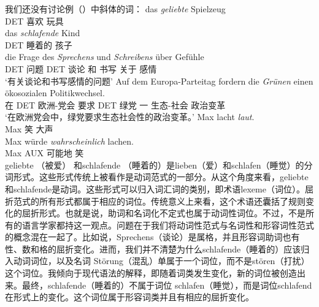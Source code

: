 我们还没有讨论例（）中斜体的词：
\eal
\ex 
\gll das \emph{geliebte} Spielzeug\\
	 DET 喜欢 玩具\\
\ex 
\gll das \emph{schlafende} Kind\\
	 DET 睡着的 孩子\\
\ex 
\gll die Frage des \emph{Sprechens} und \emph{Schreibens} über Gefühle\\
	 DET 问题 DET 谈论 和 书写 关于 感情\\
\glt `有关谈论和书写感情的问题'
\ex 
\gll Auf dem Europa-Parteitag fordern die \emph{Grünen} einen ökosozialen Politikwechsel.\\
	 在 DET 欧洲-党会 要求 DET 绿党 一 生态-社会 政治变革\\
\glt `在欧洲党会中，绿党要求生态社会性的政治变革。'
\ex\label{Wortart-adverbiales-Adjektiv} 
\gll Max lacht \emph{laut}.\\
	 Max 笑 大声\\
\ex\label{Wortart-Satzadverb-Adjektiv} 
\gll Max würde \emph{wahrscheinlich} lachen.\\
	 Max AUX 可能地 笑\\
\zl
geliebte （被爱） 和schlafende （睡着的）是lieben（爱）和schlafen（睡觉）的分词形式。这些形式传统上被看作是动词范式的一部分。从这个角度来看，geliebte和schlafende是动词。这些形式可以归入词汇词的类别，即术语lexeme（词位）。屈折范式的所有形式都属于相应的词位。传统意义上来看，这个术语还囊括了规则变化的屈折形式。也就是说，助词和名词化不定式也属于动词性词位。不过，不是所有的语言学家都持这一观点。问题在于我们将动词性范式与名词性和形容词性范式的概念混在一起了。比如说，Sprechens（谈论）是属格，并且形容词助词也有性、数和格的屈折变化。进而，我们并不清楚为什么schlafende（睡着的）应该归入动词词位，以及名词 Störung（混乱）单属于一个词位，而不是stören（打扰）这个词位。我倾向于现代语法的解释，即随着词类发生变化，新的词位被创造出来。最终，schlafende（睡着的）不属于词位 schlafen（睡觉），而是词位schlafend在形式上的变化。这个词位属于形容词类并且有相应的屈折变化。
